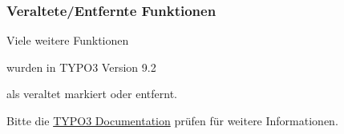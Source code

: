 \begin{frame}[fragile]
	\frametitle{Veraltete/Entfernte Funktionen}

	\vspace{0.6cm}
	\begin{center}
		Viele weitere Funktionen
	\end{center}
	\vspace{-0.8cm}
	\begin{center}
		wurden in TYPO3 Version 9.2
	\end{center}
	\vspace{-0.8cm}
	\begin{center}
		als veraltet markiert oder entfernt.
	\end{center}
	\vspace{-0.6cm}
	\begin{center}
		Bitte die \href{https://docs.typo3.org/typo3cms/extensions/core/latest/Changelog/9.2/Index.html#deprecation}{TYPO3 Documentation} prüfen für weitere Informationen.
	\end{center}

\end{frame}

